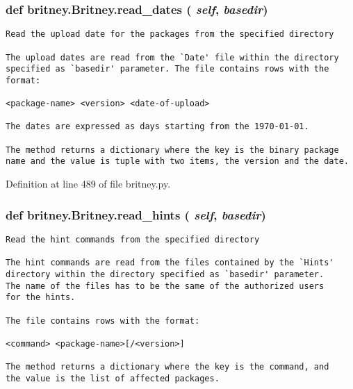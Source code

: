 \subsubsection{\setlength{\rightskip}{0pt plus 5cm}def britney.Britney.read\_\-dates ( {\em self},  {\em basedir})}\label{classbritney_1_1Britney_085af5ac906813ea40fc2e623748f517}




\footnotesize\begin{verbatim}Read the upload date for the packages from the specified directory

The upload dates are read from the `Date' file within the directory
specified as `basedir' parameter. The file contains rows with the
format:

<package-name> <version> <date-of-upload>

The dates are expressed as days starting from the 1970-01-01.

The method returns a dictionary where the key is the binary package
name and the value is tuple with two items, the version and the date.
\end{verbatim}
\normalsize
 

Definition at line 489 of file britney.py.
\subsubsection{\setlength{\rightskip}{0pt plus 5cm}def britney.Britney.read\_\-hints ( {\em self},  {\em basedir})}\label{classbritney_1_1Britney_46d535f617fcf1faaaf5d841ea23c184}




\footnotesize\begin{verbatim}Read the hint commands from the specified directory

The hint commands are read from the files contained by the `Hints'
directory within the directory specified as `basedir' parameter. 
The name of the files has to be the same of the authorized users
for the hints.

The file contains rows with the format:

<command> <package-name>[/<version>]

The method returns a dictionary where the key is the command, and
the value is the list of affected packages.
\end{verbatim}
\normalsize
 

